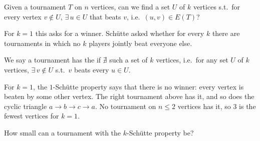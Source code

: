 \begin{question}
    Given a tournament \(T\) on \(n\) vertices, can we find a set \(U\) of \(k\) vertices s.t.\ for every vertex \(v \notin U\), \(\exists\, u \in U\) that beats \(v\), i.e.\ \((u, v) \in E(T)\)?
\end{question}

For \(k = 1\) this asks for a winner. Sch\"utte asked whether for every \(k\) there are tournaments in which no \(k\) players jointly beat everyone else.

\begin{definition}
    We say a tournament has the  if \(\nexists\) such a set of \(k\) vertices, i.e.\ for any set \(U\) of \(k\) vertices, \(\exists\, v \notin U\) s.t.\ \(v\) beats every \(u \in U\).
\end{definition}

\begin{center}
\end{center}

\begin{eg}
    For \(k = 1\), the \(1\)-Sch\"utte property says that there is no winner: every vertex is beaten by some other vertex. The right tournament above has it, and so does the cyclic triangle \(a \to b \to c \to a\). No tournament on \(n \le 2\) vertices has it, so \(3\) is the fewest vertices for \(k = 1\).
\end{eg}

\begin{question}
    How small can a tournament with the \(k\)-Sch\"utte property be?
\end{question}
